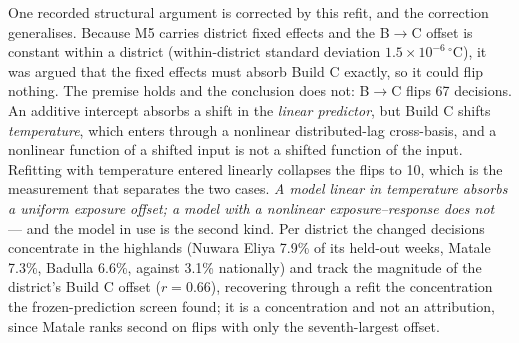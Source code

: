 \documentclass[11pt,a4paper]{article}
\begin{document}
One recorded structural argument is corrected by this refit, and the correction generalises. Because M5 carries district fixed effects and the B$\to$C offset is constant within a district (within-district standard deviation $1.5\times10^{-6}\,^{\circ}$C), it was argued that the fixed effects must absorb Build C exactly, so it could flip nothing. The premise holds and the conclusion does not: B$\to$C flips 67 decisions. An additive intercept absorbs a shift in the \emph{linear predictor}, but Build C shifts \emph{temperature}, which enters through a nonlinear distributed-lag cross-basis, and a nonlinear function of a shifted input is not a shifted function of the input. Refitting with temperature entered linearly collapses the flips to 10, which is the measurement that separates the two cases. \emph{A model linear in temperature absorbs a uniform exposure offset; a model with a nonlinear exposure--response does not} --- and the model in use is the second kind. Per district the changed decisions concentrate in the highlands (Nuwara Eliya 7.9\% of its held-out weeks, Matale 7.3\%, Badulla 6.6\%, against 3.1\% nationally) and track the magnitude of the district's Build C offset ($r=0.66$), recovering through a refit the concentration the frozen-prediction screen found; it is a concentration and not an attribution, since Matale ranks second on flips with only the seventh-largest offset.
\end{document}
